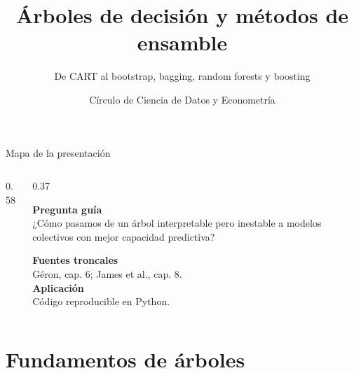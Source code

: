\documentclass[aspectratio=169,11pt,table]{beamer}
\title{Árboles de decisión y métodos de ensamble}
\subtitle{De CART al bootstrap, bagging, random forests y boosting}
\author{Círculo de Ciencia de Datos y Econometría}
\date{}
\begin{document}


\begin{frame}{Mapa de la presentación}
\begin{columns}[T,onlytextwidth]
\begin{column}{0.58\textwidth}
\tableofcontents
\end{column}
\begin{column}{0.37\textwidth}
\begin{keybox}
\textbf{Pregunta guía}\\[0.15cm]
¿Cómo pasamos de un árbol interpretable pero inestable a modelos colectivos con mejor capacidad predictiva?
\end{keybox}
\vspace{0.18cm}
\begin{ccdebox}
\small
\textbf{Fuentes troncales}\\
Géron, cap. 6; James et al., cap. 8.\\[0.12cm]
\textbf{Aplicación}\\
Código reproducible en Python.
\end{ccdebox}
\end{column}
\end{columns}
\end{frame}

\section{Fundamentos de árboles}
\end{document}
